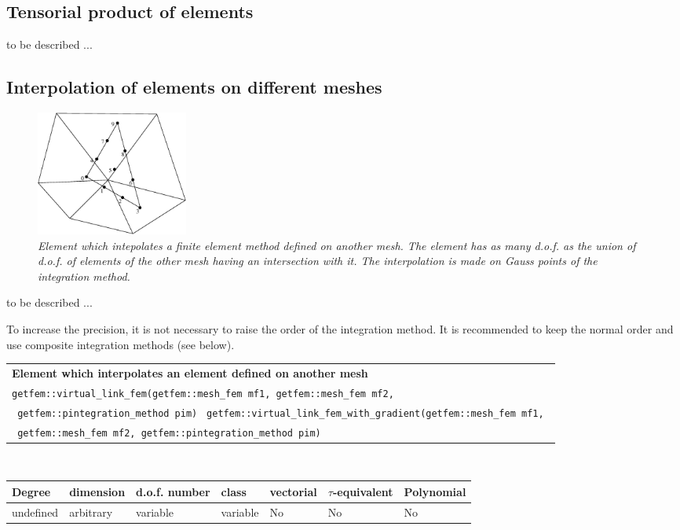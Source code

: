 \documentclass[11pt,a4paper]{article}
\begin{document}
\subsection{Tensorial product of elements}

to be described ...

\subsection{Interpolation of elements on different meshes}

\begin{figure}[H]
  \begin{center}
    \includegraphics[width=5cm,angle=0]{getfemlist_virtual_fem.eps}
  \end{center}
  \caption{ \it Element which intepolates a finite element method defined on another mesh. The element has as many d.o.f. as the union of d.o.f. of elements of the other mesh having an intersection with it. The interpolation is made on Gauss points of the integration method.} 
  \label{fig:virtual_fem}
\end{figure}

to be described ...

To increase the precision, it is not necessary to raise the order of the integration method. It is recommended to keep the normal order and use composite integration methods (see below).

\begin{center}
\begin{tabular}{|m{16.11cm}|} \hline 
{ \bf Element which interpolates an element defined on another mesh}\\
  {\tt getfem::virtual\_link\_fem(getfem::mesh\_fem mf1, getfem::mesh\_fem mf2,} \\ {\tt \mbox{}\hspace{12em} getfem::pintegration\_method pim) }
  {\tt getfem::virtual\_link\_fem\_with\_gradient(getfem::mesh\_fem mf1, } \\ {\tt \hspace{5em} getfem::mesh\_fem mf2, \mbox{}getfem::pintegration\_method pim) }
\end{tabular} \\ \vspace{-1pt} 
\begin{tabular}{|m{2cm}|m{2cm}|m{2.5cm}|m{1.2cm}|m{2cm}|m{2cm}|m{1.8cm}|} \hline 
Degree & dimension & d.o.f. number & class & vectorial & \mbox{$\tau$-equivalent} & Polynomial\\ \hline
undefined & arbitrary & variable & variable & No & No & No\\ \hline
\end{tabular}
\end{center}
\end{document}
